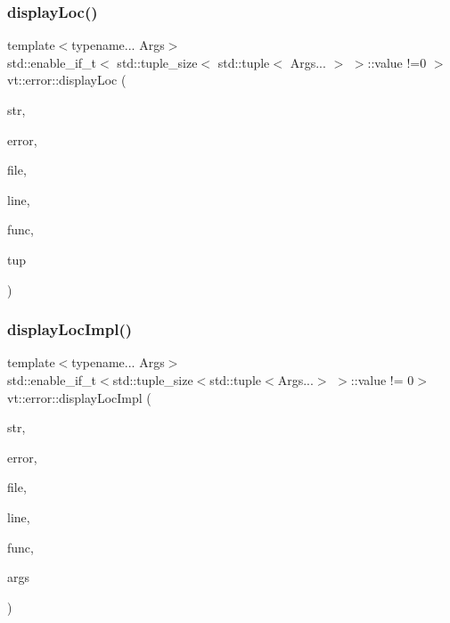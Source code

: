 \mbox{\label{namespacevt_1_1error_acc630b11da3783f4c6b4eab8f9d9c081}} 
\subsubsection{\texorpdfstring{display\+Loc()}{displayLoc()}\hspace{0.1cm}{\footnotesize\ttfamily [2/2]}}
{\footnotesize\ttfamily template$<$typename... Args$>$ \\
std\+::enable\+\_\+if\+\_\+t$<$ std\+::tuple\+\_\+size$<$ std\+::tuple$<$ Args... $>$ $>$\+::value !=0 $>$ vt\+::error\+::display\+Loc (\begin{DoxyParamCaption}\item[{std\+::string const \&}]{str,  }\item[{\hyperlink{namespacevt_a793764d753923abc3d32929870beb485}{Error\+Code\+Type}}]{error,  }\item[{std\+::string const \&}]{file,  }\item[{int const}]{line,  }\item[{std\+::string const \&}]{func,  }\item[{std\+::tuple$<$ Args... $>$ \&\&}]{tup }\end{DoxyParamCaption})\hspace{0.3cm}{\ttfamily [inline]}}

\mbox{\label{namespacevt_1_1error_a72bed290e73b0ff6a5f0c769c14c82f5}} 
\subsubsection{\texorpdfstring{display\+Loc\+Impl()}{displayLocImpl()}}
{\footnotesize\ttfamily template$<$typename... Args$>$ \\
std\+::enable\+\_\+if\+\_\+t$<$std\+::tuple\+\_\+size$<$std\+::tuple$<$Args...$>$ $>$\+::value != 0$>$ vt\+::error\+::display\+Loc\+Impl (\begin{DoxyParamCaption}\item[{std\+::string const \&}]{str,  }\item[{\hyperlink{namespacevt_a793764d753923abc3d32929870beb485}{Error\+Code\+Type}}]{error,  }\item[{std\+::string const \&}]{file,  }\item[{int const}]{line,  }\item[{std\+::string const \&}]{func,  }\item[{Args \&\&...}]{args }\end{DoxyParamCaption})\hspace{0.3cm}{\ttfamily [inline]}}

